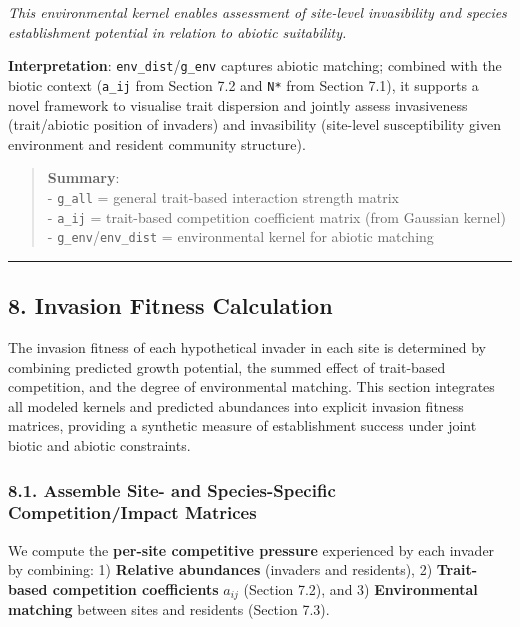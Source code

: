 \documentclass[
]{article}
\begin{document}
\emph{This environmental kernel enables assessment of site-level
invasibility and species establishment potential in relation to abiotic
suitability.}

\textbf{Interpretation}: \texttt{env\_dist}/\texttt{g\_env} captures
abiotic matching; combined with the biotic context (\texttt{a\_ij} from
Section 7.2 and \texttt{N*} from Section 7.1), it supports a novel
framework to visualise trait dispersion and jointly assess invasiveness
(trait/abiotic position of invaders) and invasibility (site-level
susceptibility given environment and resident community structure).

\begin{quote}
\textbf{Summary}:\\
- \texttt{g\_all} = general trait-based interaction strength matrix\\
- \texttt{a\_ij} = trait-based competition coefficient matrix (from
Gaussian kernel)\\
- \texttt{g\_env}/\texttt{env\_dist} = environmental kernel for abiotic
matching
\end{quote}

\begin{center}\rule{0.5\linewidth}{0.5pt}\end{center}

\hypertarget{invasion-fitness-calculation}{%
\subsection{8. Invasion Fitness
Calculation}\label{invasion-fitness-calculation}}

The invasion fitness of each hypothetical invader in each site is
determined by combining predicted growth potential, the summed effect of
trait-based competition, and the degree of environmental matching. This
section integrates all modeled kernels and predicted abundances into
explicit invasion fitness matrices, providing a synthetic measure of
establishment success under joint biotic and abiotic constraints.

\hypertarget{assemble-site--and-species-specific-competitionimpact-matrices}{%
\subsubsection{8.1. Assemble Site- and Species-Specific
Competition/Impact
Matrices}\label{assemble-site--and-species-specific-competitionimpact-matrices}}

We compute the \textbf{per-site competitive pressure} experienced by
each invader by combining: 1) \textbf{Relative abundances} (invaders and
residents), 2) \textbf{Trait-based competition coefficients} \(a_{ij}\)
(Section 7.2), and 3) \textbf{Environmental matching} between sites and
residents (Section 7.3).
\end{document}
